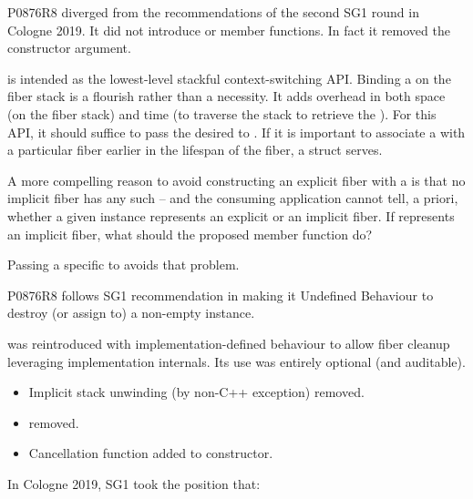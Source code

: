 P0876R8 diverged from the recommendations of the second SG1 round in Cologne
2019. It did not introduce  or 
member functions. In fact it removed the \cancelfn constructor argument.

\fiber is intended as the lowest-level stackful context-switching API. Binding
a \cancelfn on the fiber stack is a flourish rather than a necessity. It adds
overhead in both space (on the fiber stack) and time (to traverse the stack to
retrieve the \cancelfn). For this API, it should suffice to pass the desired
\cancelfn to \someresumewith. If it is important to associate a \cancelfn with
a particular fiber earlier in the lifespan of the fiber, a struct serves.

A more compelling reason to avoid constructing an explicit fiber with
a \cancelfn is that no implicit fiber has any such \cancelfn\xspace -- and the
consuming application cannot tell, a priori, whether a given \fiber instance
represents an explicit or an implicit fiber. If  represents an
implicit fiber, what should the proposed  member function do?

Passing a specific \cancelfn to \someresumewith avoids that problem.

P0876R8 follows SG1 recommendation in making it Undefined Behaviour to destroy
(or assign to) a non-empty \fiber instance.

\unwindfib was reintroduced with implementation-defined behaviour to allow fiber
cleanup leveraging implementation internals. Its use was entirely optional (and
auditable). 


\begin{itemize}
    \item Implicit stack unwinding (by non-C++ exception) removed.
    \item \unwindfib removed.
    \item Cancellation function added to \fiber constructor.
\end{itemize}

In Cologne 2019, SG1 took the position that:

